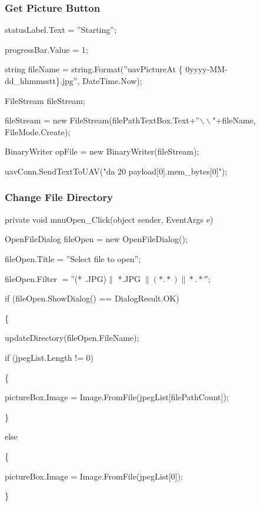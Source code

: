 \documentclass[oneside]{ecsgdp}         %
\begin{document}
\subsubsection*{Get Picture Button}



   \tab           statusLabel.Text = ''Starting'';
   
   \tab           progressBar.Value = 1;
   
\tab   string fileName = string.Format(''uavPictureAt \{ 0\:yyyy-MM-dd\_hh\-mm\-ss\-tt\}.jpg'', DateTime.Now);

      \tab      FileStream fileStream;

      \tab      fileStream = new FileStream(filePathTextBox.Text+''$\backslash \backslash$"+fileName, FileMode.Create);
      
       \tab     BinaryWriter opFile = new BinaryWriter(fileStream);


      \tab      uavConn.SendTextToUAV("da 20 payload[0].mem\_bytes[0]");

\subsubsection*{Change File Directory}
        private void mnuOpen\_Click(object sender, EventArgs e)
        
        {
        
   \tab          OpenFileDialog fileOpen = new OpenFileDialog();
            
            
   \tab          fileOpen.Title = ''Select file to open\:'';
   
    \tab         fileOpen.Filter $=$''(* .JPG)$\|$ *.JPG$\; \|(* .* )\| * .* '';$
            

    \tab         if (fileOpen.ShowDialog() == DialogResult.OK)
    
    \tab \tab         \{
    
     \tab \tab            updateDirectory(fileOpen.FileName);
     
     \tab \tab            if (jpegList.Length != 0)
     
    \tab \tab             \{
                    
       \tab \tab \tab              pictureBox.Image = Image.FromFile(jpegList[filePathCount]);
       
         \tab \tab        \}
         
       \tab \tab          else
       
       \tab \tab          \{
       
        \tab \tab \tab             pictureBox.Image = Image.FromFile(jpegList[0]);
        
        \tab \tab         \}
        
        \tab     }
        
\end{document}
